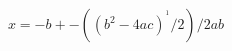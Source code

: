 \documentclass[preview]{standalone}
\begin{document}
\begin{align*}
x=-b +- ((b^2-4ac)^^1/2)/2ab
\end{align*}
\end{document}

